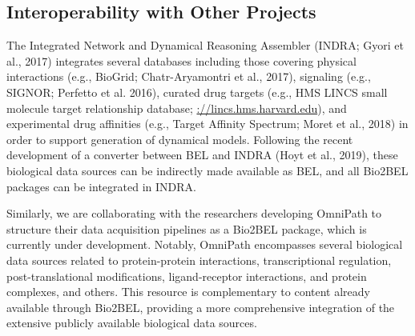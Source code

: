 \subsection*{Interoperability with Other Projects}

The Integrated Network and Dynamical Reasoning Assembler (INDRA; Gyori et al., 2017) integrates several databases including those covering physical interactions (e.g., BioGrid; Chatr-Aryamontri et al., 2017), signaling (e.g., SIGNOR; Perfetto et al. 2016), curated drug targets (e.g., HMS LINCS small molecule target relationship database; \url{://lincs.hms.harvard.edu}), and experimental drug affinities (e.g., Target Affinity Spectrum; Moret et al., 2018) in order to support generation of dynamical models.
Following the recent development of a converter between BEL and INDRA (Hoyt et al., 2019), these biological data sources can be indirectly made available as BEL, and all Bio2BEL packages can be integrated in INDRA\@.

Similarly, we are collaborating with the researchers developing OmniPath to structure their data acquisition pipelines as a Bio2BEL package, which is currently under development.
Notably, OmniPath encompasses several biological data sources related to protein-protein interactions, transcriptional regulation, post-translational modifications, ligand-receptor interactions, and protein complexes, and others.
This resource is complementary to content already available through Bio2BEL, providing a more comprehensive integration of the extensive publicly available biological data sources.

